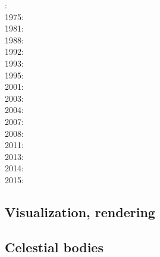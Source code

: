 : \cite{bers72}\\
1975: \cite{dixo75}\\
1981: \cite{brpo81}\\
1988: \cite{sccm88}\\
1992: \cite{vayv92}\cite{zaju92}\cite{wein92}\cite{wesc92}\cite{veja92}\\
1993: \cite{kesb93}\cite{nabr93}\cite{potp93}\cite{povp93}\cite{vasv93}\cite{pocp93}\cite{popt93}\cite{wein93}\\
1995: \cite{wepo95}\cite{bisc95}\cite{wepo95}\\
2001: \cite{kapo01}\\
2003: \cite{geur03}\cite{vavs03}\\
2004: \cite{gepm04}\cite{istt04}\cite{geur04}\\
2007: \cite{gebu07}\\
2008: \cite{buge08}\cite{zlfd08}\cite{mohc98}\\
2011: \cite{ellw11}\cite{pege11}\\
2013: \cite{fusc13}\\
2014: \cite{feka14b}\\
2015: \cite{feka15}\cite{fuks15}


\subsection*{Visualization, rendering}

\cite{faha}
\cite{chzy08}
\cite{stmt08}
\cite{cram18}

\subsection*{Celestial bodies}

